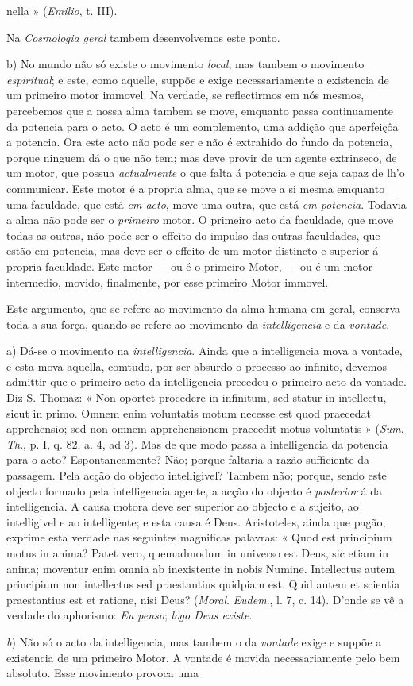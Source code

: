 nella » (\emph{Emilio}, t. III).\par Na \emph{Cosmologia geral} tambem desenvolvemos este ponto.\par b) No mundo não só existe o movimento \emph{local}, mas tambem o movimento \emph{espiritual}; e este, como aquelle, suppõe e exige necessariamente a existencia de um primeiro motor immovel. Na verdade, se reflectirmos em nós mesmos, percebemos que a nossa alma tambem se move, emquanto passa continuamente da potencia para o acto. O acto é um complemento, uma addição que aperfeiçôa a potencia. Ora este acto não pode ser e não é extrahido do fundo da potencia, porque ninguem dá o que não tem; mas deve provir de um agente extrinseco, de um motor, que possua \emph{actualmente} o que falta á potencia e que seja capaz de lh'o communicar. Este motor é a propria alma, que se move a si mesma emquanto uma faculdade, que está \emph{em acto}, move uma outra, que está \emph{em potencia}. Todavia a alma não pode ser o \emph{primeiro} motor. O primeiro acto da faculdade, que move todas as outras, não pode ser o effeito do impulso das outras faculdades, que estão em potencia, mas deve ser o effeito de um motor distincto e superior á propria faculdade. Este motor --- ou é o primeiro Motor, --- ou é um motor intermedio, movido, finalmente, por esse primeiro Motor immovel.\par Este argumento, que se refere ao movimento da alma humana em geral, conserva toda a sua força, quando se refere ao movimento da \emph{intelligencia} e da \emph{vontade}.\par a) Dá-se o movimento na \emph{intelligencia}. Ainda que a intelligencia mova a vontade, e esta mova aquella, comtudo, por ser absurdo o processo ao infinito, devemos admittir que o primeiro acto da intelligencia precedeu o primeiro acto da vontade. Diz S. Thomaz: « Non oportet procedere in infinitum, sed statur in intellectu, sicut in primo. Omnem enim voluntatis motum necesse est quod praecedat apprehensio; sed non omnem apprehensionem praecedit motus voluntatis » (\emph{Sum}. \emph{Th}., p. I, q. 82, a. 4, ad 3). Mas de que modo passa a intelligencia da potencia para o acto? Espontaneamente? Não; porque faltaria a razão sufficiente da passagem. Pela acção do objecto intelligivel? Tambem não; porque, sendo este objecto formado pela intelligencia agente, a acção do objecto é \emph{posterior} á da intelligencia. A causa motora deve ser superior ao objecto e a sujeito, ao intelligivel e ao intelligente; e esta causa é Deus. Aristoteles, ainda que pagão, exprime esta verdade nas seguintes magnificas palavras: « Quod est principium motus in anima? Patet vero, quemadmodum in universo est Deus, sic etiam in anima; moventur enim omnia ab inexistente in nobis Numine. Intellectus autem principium non intellectus sed praestantius quidpiam est. Quid autem et scientia praestantius est et ratione, nisi Deus? (\emph{Moral}. \emph{Eudem}., l. 7, c. 14). D'onde se vê a verdade do aphorismo: \emph{Eu penso}; \emph{logo Deus existe}.\par \emph{b}) Não só o acto da intelligencia, mas tambem o da \emph{vontade} exige e suppõe a existencia de um primeiro Motor. A vontade é movida necessariamente pelo bem absoluto. Esse movimento provoca uma 